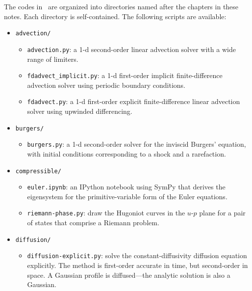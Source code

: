 The codes in \hydroex\ are organized into directories named after the
chapters in these notes.  Each directory is self-contained.  The
following scripts are available:

\begin{itemize}

\item {\tt advection/}
  
  \begin{itemize}
  \item {\tt advection.py}: a 1-d second-order linear advection solver
    with a wide range of limiters.

  \item {\tt fdadvect\_implicit.py}: a 1-d first-order implicit
    finite-difference advection solver using periodic boundary
    conditions.

  \item {\tt fdadvect.py}: a 1-d first-order explicit
    finite-difference linear advection solver using upwinded
    differencing.

  \end{itemize}

\item {\tt burgers/}

  \begin{itemize}
  \item {\tt burgers.py}: a 1-d second-order solver for the inviscid
    Burgers' equation, with initial conditions corresponding to a
    shock and a rarefaction.

  \end{itemize}

\item {\tt compressible/}

  \begin{itemize}
  \item {\tt euler.ipynb}: an {\sf IPython} notebook using {\sf SymPy}
      that derives the eigensystem for the primitive-variable form
      of the Euler equations.
      
  \item {\tt riemann-phase.py}: draw the Hugoniot curves in the $u$-$p$ plane
     for a pair of states that comprise a Riemann problem.
  \end{itemize}

\item {\tt diffusion/}

  \begin{itemize}
    \item {\tt diffusion-explicit.py}: solve the constant-diffusivity
      diffusion equation explicitly.  The method is first-order
      accurate in time, but second-order in space.  A Gaussian profile
      is diffused---the analytic solution is also a Gaussian.


\end{itemize}
\end{itemize}
